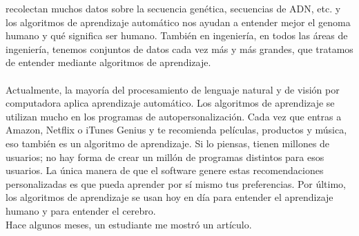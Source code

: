 \documentclass{report}
\begin{document}
recolectan muchos datos sobre la secuencia genética, secuencias de ADN, etc.
y los algoritmos de aprendizaje automático nos ayudan a entender mejor el genoma
humano y qué significa ser humano. También en ingeniería, en todos las áreas de
ingeniería, tenemos conjuntos de datos cada vez más y más grandes, que
tratamos de entender mediante algoritmos de aprendizaje.\\\\ Actualmente, la mayoría del procesamiento de
lenguaje natural y de visión por computadora aplica aprendizaje automático. Los algoritmos de
aprendizaje se utilizan mucho en los programas de autopersonalización. Cada vez que entras a
Amazon, Netflix o iTunes Genius y te recomienda películas, productos y música,
eso también es un algoritmo de aprendizaje. Si lo piensas, tienen millones de usuarios;
no hay forma de crear un millón de programas distintos para esos usuarios.
La única manera de que el software genere estas recomendaciones personalizadas es
que pueda aprender por sí mismo tus preferencias. Por último, los algoritmos
de aprendizaje se usan hoy en día para entender el aprendizaje humano
y para entender el cerebro.\\ Hace algunos meses, un estudiante me mostró un artículo.
\end{document}
